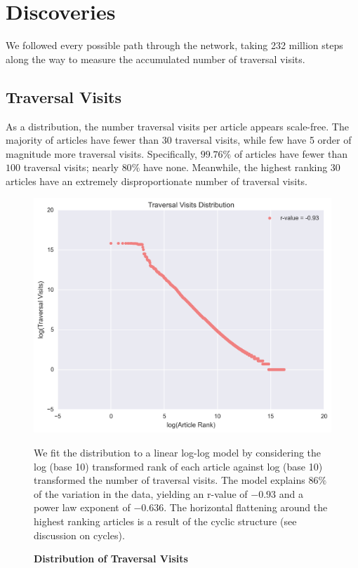 \documentclass[pre,twocolumn,twoside,superscriptaddress,floatfix, aps, 10pt]{revtex4-1}
\begin{document}
\section{Discoveries}

We followed every possible path through the network, taking 232 million steps along the way to measure the accumulated number of traversal visits.

\subsection{Traversal Visits}

As a distribution, the number traversal visits per article appears scale-free. The majority of articles have fewer than 30 traversal visits, while few 
have 5 order of magnitude more traversal visits. 
Specifically, $99.76\%$ of articles have fewer than $100$ traversal visits; nearly $80\%$ have none. 
Meanwhile, the highest ranking 30 articles have an extremely disproportionate number of traversal visits.

\begin{figure}[tp!]
  \centering	
  \includegraphics[width=\columnwidth]{graphics/traversals_per_article.png} 
  \caption{
    \textbf{Distribution of Traversal Visits}
  }
  We fit the distribution to a linear log-log model by considering the log (base 10) transformed rank of each article against log (base 10) transformed the number of traversal visits. 
  The model explains $86\%$ of the variation in the data, yielding an r-value of $-0.93$ 
  and a power law exponent of $-0.636$. The horizontal flattening around the highest
  ranking articles is a result of the cyclic structure (see discussion on cycles).
  \label{fig:Distribution of Visits}

\end{figure}
\end{document}
